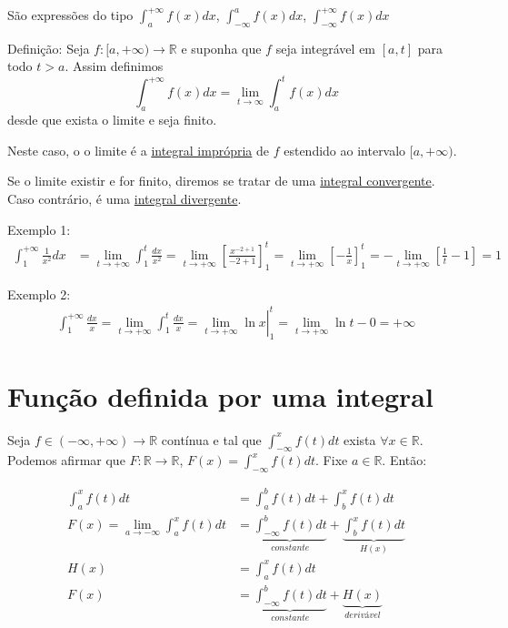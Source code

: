 \documentclass[12pt,openany]{book}
\begin{document}
\hspace{5mm} São expressões do tipo $\displaystyle{\int_a^{+ \infty}f(x)dx}$, $\displaystyle{\int_{-\infty}^{a} f(x)dx}$, $\displaystyle{\int_{-\infty}^{+ \infty}f(x)dx}$\\
\vspace{15pt}

Definição: Seja $f:{[a,+\infty)}\rightarrow \mathds{R}$ e suponha que $f$ seja integrável em $[a,t]$ para todo $t>a$. Assim definimos $$ \int_a^{+\infty}f(x)dx = \lim_{t\rightarrow\infty}\int_a^t f(x)dx$$ desde que exista o limite e seja finito.

Neste caso, o o limite é a \underline{integral imprópria} de $f$ estendido ao intervalo $[a,+\infty)$.

Se o limite existir e for finito, diremos se tratar de uma \underline{integral convergente}. Caso contrário, é uma \underline{integral divergente}.

Exemplo 1:
\begin{align*}
\int_1^{+\infty}\frac{1}{x^2}dx &= \lim_{t\rightarrow + \infty}\int_1^t \frac{dx}{x^2}=\lim_{t\rightarrow + \infty}\left[\frac{x^{-2+1}}{-2+1}\right]_1^t = \lim_{t\rightarrow + \infty}\left[-\frac{1}{x}\right]_1^t = -\lim_{t\rightarrow + \infty}\left[\frac{1}{t}-1\right]=1
\end{align*}

Exemplo 2:
\begin{align*}
\int_1^{+\infty}\frac{dx}{x}= \lim_{t\rightarrow + \infty}\int_1^t\frac{dx}{x}= \left.\lim_{t\rightarrow + \infty}\ln x \right|_1^t = \lim_{t\rightarrow + \infty}\ln t - 0 = +\infty
\end{align*}

\section{Função definida por uma integral}
\label{sec:s22}

\hspace{5mm} Seja $f \in (-\infty, +\infty) \rightarrow \mathds{R}$ contínua e tal que $\displaystyle{\int_{-\infty}^x f(t)dt}$ exista $\displaystyle{\forall x \in \mathds{R}}$. Podemos afirmar que $F:\mathds{R}\rightarrow\mathds{R}$, $\displaystyle{F(x)=\int_{-\infty}^x f(t)dt}$. Fixe $a \in \mathds{R}$. Então:

\begin{align*}
\int_a^x f(t)dt &= \int_a^b f(t)dt + \int_b^x f(t)dt \\
F(x) = \lim_{a\rightarrow - \infty}\int_a^xf(t)dt &= \underbrace{\int_{-\infty}^b f(t)dt}_{constante} + \underbrace{\int_b^x f(t)dt}_{H(x)}\\
H(x) &= \int_a^x f(t)dt \\
F(x) &= \underbrace{\int_{-\infty}^b f(t)dt}_{constante}+ \underbrace{H(x)}_{derivável} 
\end{align*}
\end{document}
